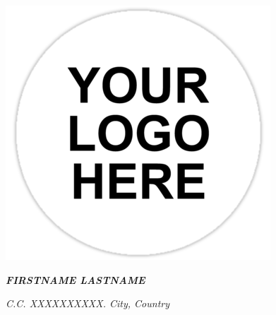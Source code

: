\documentclass[american]{cv-class}
\begin{document}
\begin{flushright}
    	\emph{{\includegraphics[scale=0.25]{img/generic-logo.png}}}
\end{flushright}
\begin{flushright}
	\emph{\textbf{FIRSTNAME LASTNAME}}
\end{flushright}
\begin{flushright}
	\emph{C.C. XXXXXXXXXX. City, Country}
\end{flushright}
\end{document}
